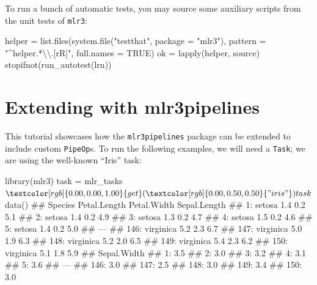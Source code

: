 \documentclass[12pt,]{scrbook}
\newenvironment{Shaded}{}{}
\newcommand{\CharTok}[1]{\textcolor[rgb]{0.00,0.50,0.50}{#1}}
\newcommand{\DataTypeTok}[1]{#1}
\newcommand{\KeywordTok}[1]{\textcolor[rgb]{0.00,0.00,1.00}{#1}}
\newcommand{\NormalTok}[1]{#1}
\newcommand{\OperatorTok}[1]{#1}
\newcommand{\OtherTok}[1]{\textcolor[rgb]{1.00,0.25,0.00}{#1}}
\newcommand{\StringTok}[1]{\textcolor[rgb]{0.00,0.50,0.50}{#1}}
\begin{document}
To run a bunch of automatic tests, you may source some auxiliary scripts from the unit tests of \texttt{mlr3}:

\begin{Shaded}
\begin{Highlighting}[]
\NormalTok{helper =}\StringTok{ }\KeywordTok{list.files}\NormalTok{(}\KeywordTok{system.file}\NormalTok{(}\StringTok{"testthat"}\NormalTok{, }\DataTypeTok{package =} \StringTok{"mlr3"}\NormalTok{), }
  \DataTypeTok{pattern =} \StringTok{"^helper.*}\CharTok{\textbackslash{}\textbackslash{}}\StringTok{.[rR]"}\NormalTok{, }\DataTypeTok{full.names =} \OtherTok{TRUE}\NormalTok{)}
\NormalTok{ok =}\StringTok{ }\KeywordTok{lapply}\NormalTok{(helper, source)}
\KeywordTok{stopifnot}\NormalTok{(}\KeywordTok{run_autotest}\NormalTok{(lrn))}
\end{Highlighting}
\end{Shaded}

\hypertarget{extending-mlr3pipelines}{%
\section{Extending with mlr3pipelines}\label{extending-mlr3pipelines}}

This tutorial showcases how the \texttt{mlr3pipelines} package can be extended to include custom \texttt{PipeOp}s.
To run the following examples, we will need a \texttt{Task}; we are using the well-known ``Iris'' task:

\begin{Shaded}
\begin{Highlighting}[]
\KeywordTok{library}\NormalTok{(mlr3)}
\NormalTok{task =}\StringTok{ }\NormalTok{mlr_tasks}\OperatorTok{$}\KeywordTok{get}\NormalTok{(}\StringTok{"iris"}\NormalTok{)}
\NormalTok{task}\OperatorTok{$}\KeywordTok{data}\NormalTok{()}
\NormalTok{##        Species Petal.Length Petal.Width Sepal.Length}
\NormalTok{##   1:    setosa          1.4         0.2          5.1}
\NormalTok{##   2:    setosa          1.4         0.2          4.9}
\NormalTok{##   3:    setosa          1.3         0.2          4.7}
\NormalTok{##   4:    setosa          1.5         0.2          4.6}
\NormalTok{##   5:    setosa          1.4         0.2          5.0}
\NormalTok{##  ---                                                }
\NormalTok{## 146: virginica          5.2         2.3          6.7}
\NormalTok{## 147: virginica          5.0         1.9          6.3}
\NormalTok{## 148: virginica          5.2         2.0          6.5}
\NormalTok{## 149: virginica          5.4         2.3          6.2}
\NormalTok{## 150: virginica          5.1         1.8          5.9}
\NormalTok{##      Sepal.Width}
\NormalTok{##   1:         3.5}
\NormalTok{##   2:         3.0}
\NormalTok{##   3:         3.2}
\NormalTok{##   4:         3.1}
\NormalTok{##   5:         3.6}
\NormalTok{##  ---            }
\NormalTok{## 146:         3.0}
\NormalTok{## 147:         2.5}
\NormalTok{## 148:         3.0}
\NormalTok{## 149:         3.4}
\NormalTok{## 150:         3.0}
\end{Highlighting}
\end{Shaded}
\end{document}
